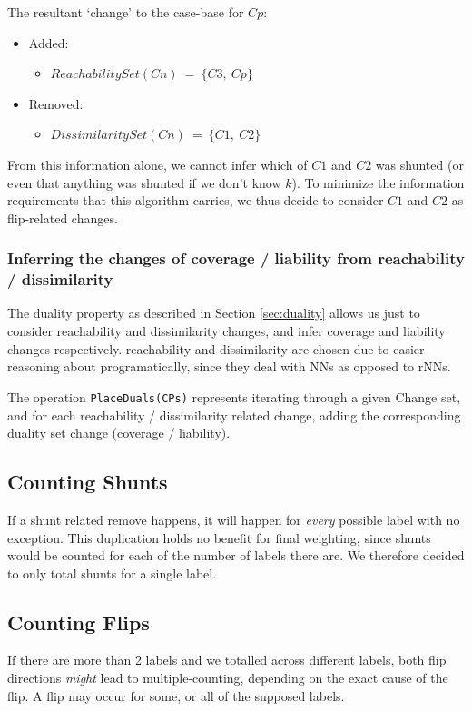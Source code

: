 \documentclass[a4paper,11pt]{report}
\begin{document}
The resultant `change' to the case-base for $Cp$:
\begin{itemize}
	\item Added: 
	\begin{itemize}
		\item $ReachabilitySet(Cn)~=~\{C3,~Cp\}$
	\end{itemize}
	\item Removed:
	\begin{itemize}
		\item $DissimilaritySet(Cn)~=~\{C1,~C2\}$
	\end{itemize}
\end{itemize}

From this information alone, we cannot infer which of $C1$ and $C2$ was shunted (or even that anything was shunted if we don't know $k$). To minimize the information requirements that this algorithm carries, we thus decide to consider $C1$ and $C2$ as flip-related changes.

\subsubsection{Inferring the changes of coverage / liability from reachability / dissimilarity}
The duality property as described in Section \ref{sec:duality} allows us just to consider reachability and dissimilarity changes, and infer coverage and liability changes respectively. reachability and dissimilarity are chosen due to easier reasoning about programatically, since they deal with NNs as opposed to rNNs.

The operation \verb!PlaceDuals(CPs)! represents iterating through a given Change set, and for each reachability / dissimilarity related change, adding the corresponding duality set change (coverage / liability).

\subsection{Counting Shunts}
If a shunt related remove happens, it will happen for \emph{every} possible label with no exception. This duplication holds no benefit for final weighting, since shunts would be counted for each of the number of labels there are. We therefore decided to only total shunts for a single label.

\subsection{Counting Flips}
If there are more than 2 labels and we totalled across different labels, both flip directions \emph{might} lead to multiple-counting, depending on the exact cause of the flip. A flip may occur for some, or all of the supposed labels.
\end{document}
